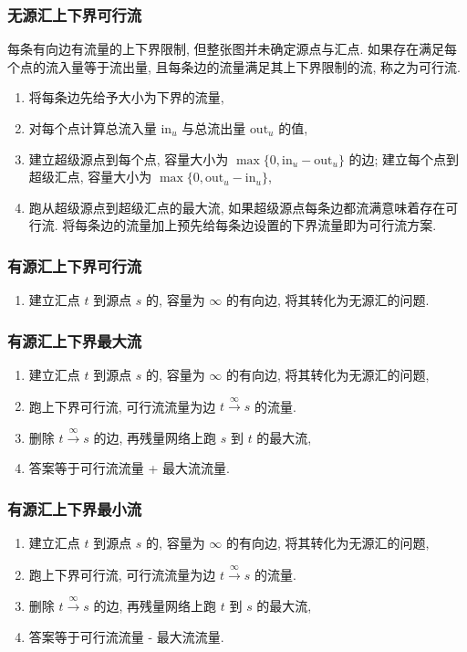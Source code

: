 \documentclass[UTF8, a4paper, titlepage, twoside]{ctexart}
\begin{document}
\subsubsection*{ 无源汇上下界可行流 }
每条有向边有流量的上下界限制, 但整张图并未确定源点与汇点. 如果存在满足每个点的流入量等于流出量, 且每条边的流量满足其上下界限制的流, 称之为可行流.
\begin{enumerate}
    \item 将每条边先给予大小为下界的流量,
    \item 对每个点计算总流入量 $\text{in}_u$ 与总流出量 $\text{out}_u$ 的值,
    \item 建立超级源点到每个点, 容量大小为 $\max\{0, \text{in}_u - \text{out}_u\}$ 的边; 建立每个点到超级汇点, 容量大小为 $\max\{0, \text{out}_u - \text{in}_u\}$,
    \item 跑从超级源点到超级汇点的最大流, 如果超级源点每条边都流满意味着存在可行流. 将每条边的流量加上预先给每条边设置的下界流量即为可行流方案.
\end{enumerate}

\subsubsection*{ 有源汇上下界可行流 }
\begin{enumerate}
    \item 建立汇点 $t$ 到源点 $s$ 的, 容量为 $\infty$ 的有向边, 将其转化为无源汇的问题.
\end{enumerate}

\subsubsection*{ 有源汇上下界最大流 }
\begin{enumerate}
    \item 建立汇点 $t$ 到源点 $s$ 的, 容量为 $\infty$ 的有向边, 将其转化为无源汇的问题,
    \item 跑上下界可行流, 可行流流量为边 $t \xrightarrow{\infty} s$ 的流量.
    \item 删除 $t \xrightarrow{\infty} s$ 的边, 再残量网络上跑 $s$ 到 $t$ 的最大流,
    \item 答案等于可行流流量 + 最大流流量.
\end{enumerate}

\subsubsection*{ 有源汇上下界最小流 }
\begin{enumerate}
    \item 建立汇点 $t$ 到源点 $s$ 的, 容量为 $\infty$ 的有向边, 将其转化为无源汇的问题,
    \item 跑上下界可行流, 可行流流量为边 $t \xrightarrow{\infty} s$ 的流量.
    \item 删除 $t \xrightarrow{\infty} s$ 的边, 再残量网络上跑 $t$ 到 $s$ 的最大流,
    \item 答案等于可行流流量 - 最大流流量.
\end{enumerate}
\end{document}
